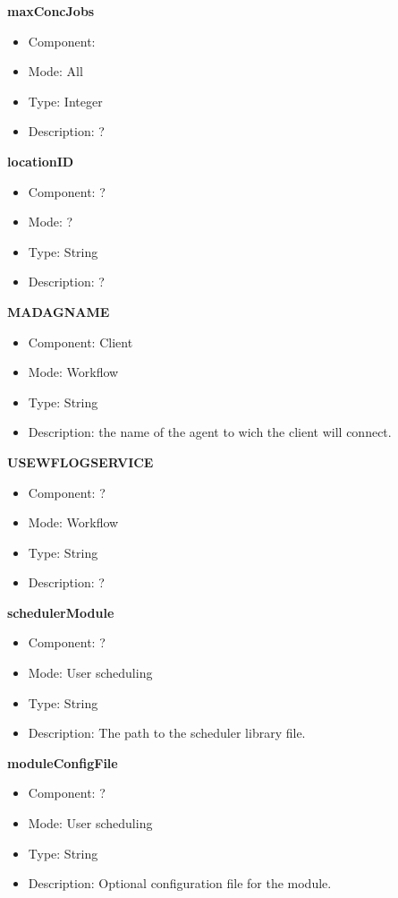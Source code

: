 \begin{description}
\item{\bf{maxConcJobs}}
  \begin{itemize}
  \item Component: \sed
  \item Mode: All
  \item Type: Integer
  \item Description: ?
  \end{itemize}

\item{\bf{locationID}}
  \begin{itemize}
  \item Component: ?
  \item Mode: ?
  \item Type: String
  \item Description: ?
  \end{itemize}

\item{\bf{MADAGNAME}}
  \begin{itemize}
  \item Component: Client
  \item Mode: Workflow
  \item Type: String
  \item Description: the name of the \madag agent to wich the client
    will connect.
  \end{itemize}

\item{\bf{USEWFLOGSERVICE}}
  \begin{itemize}
  \item Component: ?
  \item Mode: Workflow
  \item Type: String
  \item Description: ?
  \end{itemize}

\item{\bf{schedulerModule}}
  \begin{itemize}
  \item Component: ?
  \item Mode: User scheduling
  \item Type: String
  \item Description: The path to the scheduler library file.
  \end{itemize}

\item{\bf{moduleConfigFile}}
  \begin{itemize}
  \item Component: ?
  \item Mode: User scheduling
  \item Type: String
  \item Description: Optional configuration file for the module.
  \end{itemize}


\end{description}
